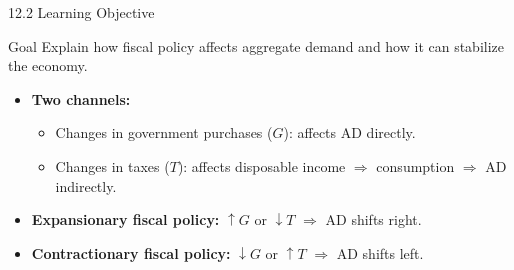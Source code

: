 \documentclass[aspectratio=169]{beamer}
\begin{document}
\begin{frame}{12.2 Learning Objective}
\transfade
\begin{block}{Goal}
Explain how fiscal policy affects aggregate demand and how it can stabilize the economy.
\end{block}
\begin{itemize}
  \item \textbf{Two channels:}
  \begin{itemize}
    \item Changes in government purchases ($G$): affects AD \alert{directly}.
    \item Changes in taxes ($T$): affects disposable income $\Rightarrow$ consumption $\Rightarrow$ AD \alert{indirectly}.
  \end{itemize}
  \item \textbf{Expansionary fiscal policy:} $\uparrow G$ or $\downarrow T$ $\Rightarrow$ AD shifts right.
  \item \textbf{Contractionary fiscal policy:} $\downarrow G$ or $\uparrow T$ $\Rightarrow$ AD shifts left.
\end{itemize}
\end{frame}
\end{document}
